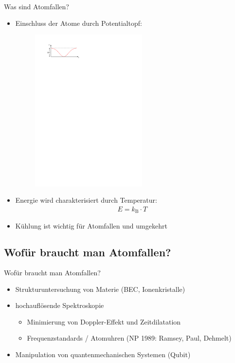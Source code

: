 \documentclass[12pt,xcolor=dvipsnames]{beamer}
\begin{document}
\begin{frame}{Was sind Atomfallen?}
	\begin{itemize}
		\setlength\itemsep{1em}
		\item Einschluss der Atome durch Potentialtopf:
			\vspace{0.2cm}
			\begin{figure}
				\centering
				\includegraphics[width=0.55\textwidth]{./figures/fallentiefe.pdf}
			\end{figure}
		\item Energie wird charakterisiert durch Temperatur:
		\begin{align*}
		E = k_\mathrm{B} \cdot T
		\end{align*}
		
		\item Kühlung ist wichtig für Atomfallen und umgekehrt
		
	\end{itemize}

\end{frame}

\subsection{Wofür braucht man Atomfallen?}
\begin{frame}{Wofür braucht man Atomfallen?}
	\begin{itemize}
		\setlength\itemsep{1em}
		\item Strukturuntersuchung von Materie (BEC, Ionenkristalle)
		
		\item hochauflösende Spektroskopie
			\begin{itemize}
				\item Minimierung von Doppler-Effekt und Zeitdilatation
				\item Frequenzstandards / Atomuhren (NP 1989: Ramsey, Paul, Dehmelt)
			\end{itemize}
		
		\item Manipulation von quantenmechanischen Systemen (Qubit)
	\end{itemize}
\end{frame}
\end{document}
